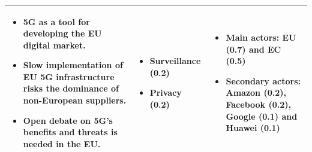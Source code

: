 \documentclass[aspectratio=169]{beamer}
\begin{document}
\begin{frame}
{{\begin{block}
\begin{tabular}{|>{\centering\arraybackslash}p{}|>{\centering\arraybackslash}p{}|>{\centering\arraybackslash}p{}|}
                \begin{itemize}\item 5G as a tool for developing the EU digital market. \item Slow implementation of EU 5G infrastructure risks the dominance of non-European suppliers. \item Open debate on 5G's benefits and threats is needed in the EU. \end{itemize}& \begin{itemize} \item \textbf{Surveillance} (0.2) \item \textbf{Privacy} (0.2) \end{itemize} & \begin{itemize} \item \textbf{Main actors}: EU (0.7) and EC (0.5) \item \textbf{Secondary actors}: Amazon (0.2), Facebook (0.2), Google (0.1) and Huawei (0.1) \end{itemize} \\
                \hline
            \end{tabular}
         \end{block} 
      }
   }
\end{frame}
\end{document}
